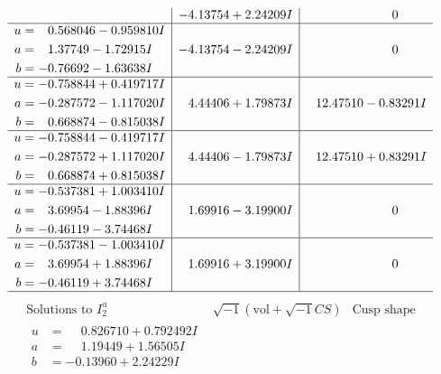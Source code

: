 \documentclass[1p]{elsarticle_modified}
\theoremstyle{definition}
\newcommand{\I}{\sqrt{-1}}
\begin{document}
$$\begin{array}{c|c|c}
 & -4.13754 + 2.24209 I & \phantom{-0.000000 } 0 \\ \hline\begin{aligned}
u &= \phantom{-}0.568046 - 0.959810 I \\
a &= \phantom{-}1.37749 - 1.72915 I \\
b &= -0.76692 - 1.63638 I\end{aligned}
 & -4.13754 - 2.24209 I & \phantom{-0.000000 } 0 \\ \hline\begin{aligned}
u &= -0.758844 + 0.419717 I \\
a &= -0.287572 - 1.117020 I \\
b &= \phantom{-}0.668874 - 0.815038 I\end{aligned}
 & \phantom{-}4.44406 + 1.79873 I & \phantom{-}12.47510 - 0.83291 I \\ \hline\begin{aligned}
u &= -0.758844 - 0.419717 I \\
a &= -0.287572 + 1.117020 I \\
b &= \phantom{-}0.668874 + 0.815038 I\end{aligned}
 & \phantom{-}4.44406 - 1.79873 I & \phantom{-}12.47510 + 0.83291 I \\ \hline\begin{aligned}
u &= -0.537381 + 1.003410 I \\
a &= \phantom{-}3.69954 - 1.88396 I \\
b &= -0.46119 - 3.74468 I\end{aligned}
 & \phantom{-}1.69916 - 3.19900 I & \phantom{-0.000000 } 0 \\ \hline\begin{aligned}
u &= -0.537381 - 1.003410 I \\
a &= \phantom{-}3.69954 + 1.88396 I \\
b &= -0.46119 + 3.74468 I\end{aligned}
 & \phantom{-}1.69916 + 3.19900 I & \phantom{-0.000000 } 0\\
 \hline 
 \end{array}$$\newpage$$\begin{array}{c|c|c}  
\text{Solutions to }I^u_{2}& \I (\text{vol} + \sqrt{-1}CS) & \text{Cusp shape}\\
 \hline 
\begin{aligned}
u &= \phantom{-}0.826710 + 0.792492 I \\
a &= \phantom{-}1.19449 + 1.56505 I \\
b &= -0.13960 + 2.24229 I\end{aligned}

\end{array}$$
\end{document}

